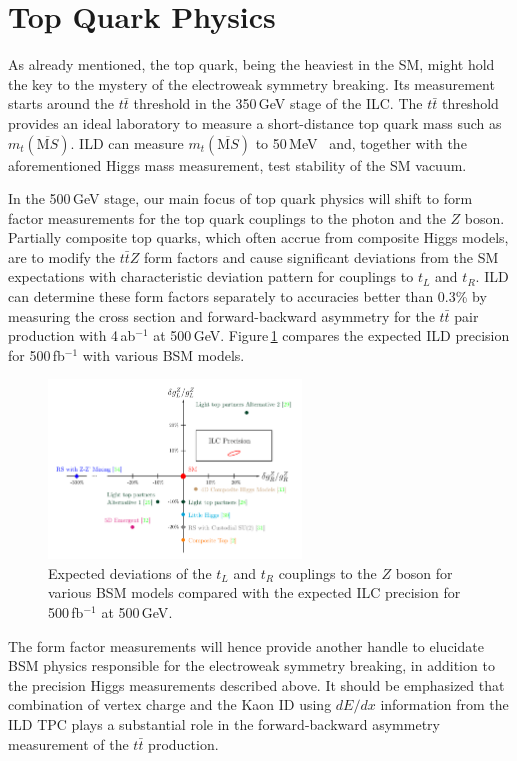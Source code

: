 \section{Top Quark Physics}
As already mentioned, the top quark, being the heaviest in the SM, might hold the key to the mystery of the electroweak symmetry breaking. Its measurement starts around the $t\bar{t}$ threshold in the 350\,GeV stage of the ILC. The $t\bar{t}$ threshold provides an ideal laboratory to measure a short-distance top quark mass such as $m_t(\overline{\mathrm MS})$. ILD can measure $m_t(\overline{\mathrm MS})$ to 50\,MeV~\cite{Horiguchi:2013wra, Vos:2016til} and, together with the aforementioned Higgs mass measurement, test stability of the SM vacuum. 

In the 500\,GeV stage, our main focus of top quark physics will shift to form factor measurements for the top quark couplings to the photon and the $Z$ boson. Partially composite top quarks, which often accrue from composite Higgs models, are to modify the $t\bar{t}Z$ form factors and cause significant deviations from the SM expectations with characteristic deviation pattern for couplings to $t_L$ and $t_R$. ILD can determine these form factors separately to accuracies better than 0.3\%
by measuring the cross section and forward-backward asymmetry for the $t\bar{t}$ pair production with 4\,ab$^{-1}$ at 500\,GeV\cite{Amjad:2015mma}. 
Figure\,\ref{fig:ttZ_gLgR} compares the expected ILD precision for 500\,fb$^{-1}$ with various BSM models.
\begin{figure}[htbp]
\begin{center}
 \includegraphics[width=0.6\textwidth]{Science/fig/ttZ_gLgR}
\end{center}
\caption{Expected deviations of the $t_L$ and $t_R$ couplings to the $Z$ boson for various BSM models compared with the expected ILC precision for 500\,fb$^{-1}$ at 500\,GeV\cite{Amjad:2015mma}.
}
\label{fig:ttZ_gLgR}
\end{figure}
The form factor measurements will hence provide another handle to elucidate BSM physics responsible for the electroweak symmetry breaking, in addition to the precision Higgs measurements described above. It should be emphasized that combination of vertex charge and the Kaon ID using $dE/dx$ information from the ILD TPC plays a substantial role in the forward-backward asymmetry measurement of the $t\bar{t}$ production\cite{Ref:bilokin2017}.
%


